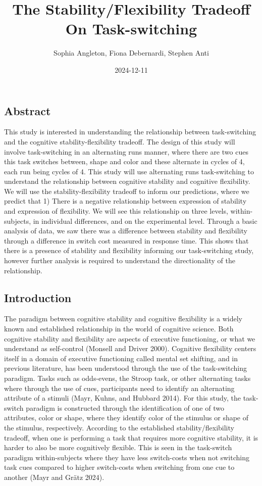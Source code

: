 \documentclass[
  11pt,
]{article}
\title{The Stability/Flexibility Tradeoff On Task-switching}
\author{Sophia Angleton, Fiona Debernardi, Stephen Anti}
\date{2024-12-11}
\begin{document}
\maketitle

{
\setcounter{tocdepth}{2}
\tableofcontents
}
\subsection{Abstract}\label{abstract}

This study is interested in understanding the relationship between
task-switching and the cognitive stability-flexibility tradeoff. The
design of this study will involve task-switching in an alternating runs
manner, where there are two cues this task switches between, shape and
color and these alternate in cycles of 4, each run being cycles of 4.
This study will use alternating runs task-switching to understand the
relationship between cognitive stability and cognitive flexibility. We
will use the stability-flexibility tradeoff to inform our predictions,
where we predict that 1) There is a negative relationship between
expression of stability and expression of flexibility. We will see this
relationship on three levels, within-subjects, in individual
differences, and on the experimental level. Through a basic analysis of
data, we saw there was a difference between stability and flexibility
through a difference in switch cost measured in response time. This
shows that there is a presence of stability and flexibility informing
our task-switching study, however further analysis is required to
understand the directionality of the relationship.

\subsection{Introduction}\label{introduction}

The paradigm between cognitive stability and cognitive flexibility is a
widely known and established relationship in the world of cognitive
science. Both cognitive stability and flexibility are aspects of
executive functioning, or what we understand as self-control (Monsell
and Driver 2000). Cognitive flexibility centers itself in a domain of
executive functioning called mental set shifting, and in previous
literature, has been understood through the use of the task-switching
paradigm. Tasks such as odds-evens, the Stroop task, or other
alternating tasks where through the use of cues, participants need to
identify an alternating attribute of a stimuli (Mayr, Kuhns, and Hubbard
2014). For this study, the task-switch paradigm is constructed through
the identification of one of two attributes, color or shape, where they
identify color of the stimulus or shape of the stimulus, respectively.
According to the established stability/flexibility tradeoff, when one is
performing a task that requires more cognitive stability, it is harder
to also be more cognitively flexible. This is seen in the task-switch
paradigm within-subjects where they have less switch-costs when not
switching task cues compared to higher switch-costs when switching from
one cue to another (Mayr and Grätz 2024).
\end{document}
